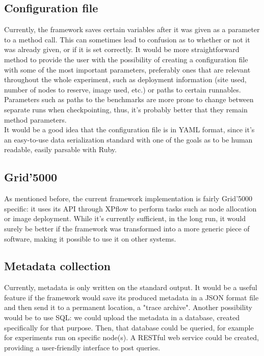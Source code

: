 \subsection{Configuration file}
Currently, the framework saves certain variables after it was given as
a parameter to a method call. This can sometimes lead to confusion as
to whether or not it was already given, or if it is set correctly. It
would be more straightforward method to provide the user with
the possibility of creating a configuration file with some of the most
important parameters, preferably ones that are relevant throughout the
whole experiment, such as deployment information (site used,
number of nodes to reserve, image used, etc.) or paths to certain
runnables. Parameters such as paths to the benchmarks are more prone
to change between separate runs when checkpointing, thus, it's
probably better that they remain method parameters.\\
It would be a good idea that the configuration file is in
YAML\cite{ben09} format, since it's an easy-to-use data serialization
standard with one of the goals as to be human readable, easily
parsable with Ruby.
\subsection{Grid'5000}
As mentioned before, the current framework implementation is fairly
Grid'5000 specific: it uses its API through XPflow to perform tasks
such as node allocation or image deployment. While it's currently
sufficient, in the long run, it would surely be better if the
framework was transformed into a more generic piece of software,
making it possible to use it on other systems.
\subsection{Metadata collection}
Currently, metadata is only written on the standard output. It would
be a useful feature if the framework would save its produced metadata
in a JSON format file and then send it to a permanent location, a
"trace archive". Another possibility would be to use SQL: we could
upload the metadata in a database, created specifically for that
purpose. Then, that database could be queried, for example for
experiments run on specific node(s). A RESTful web service could be
created, providing a user-friendly interface to post queries.
